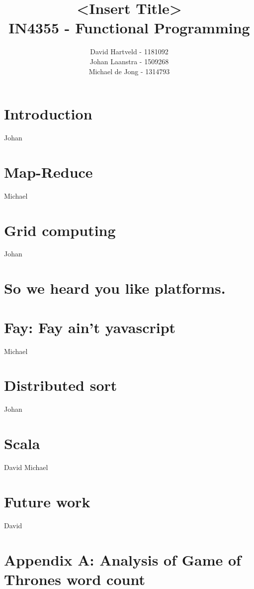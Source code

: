 \documentclass{article}
\title{<Insert Title>\\
IN4355 - Functional Programming}
\author{David Hartveld - 1181092 \\
		Johan Laanstra - 1509268 \\
		Michael de Jong - 1314793}
\begin{document}
\maketitle

\section{Introduction}
	
	Johan
		
\section{Map-Reduce}
	
	Michael
	
\section{Grid computing}
	
	Johan
	
\section{So we heard you like platforms.}
	
	
\section{Fay: Fay ain't yavascript}
	
	Michael
	
\section{Distributed sort}
	
	Johan
	
\section{Scala}
	
	David
	Michael
	
\section{Future work}
	
	David
	


	
\pagebreak


\section{Appendix A: Analysis of Game of Thrones word count}
	
\end{document}
